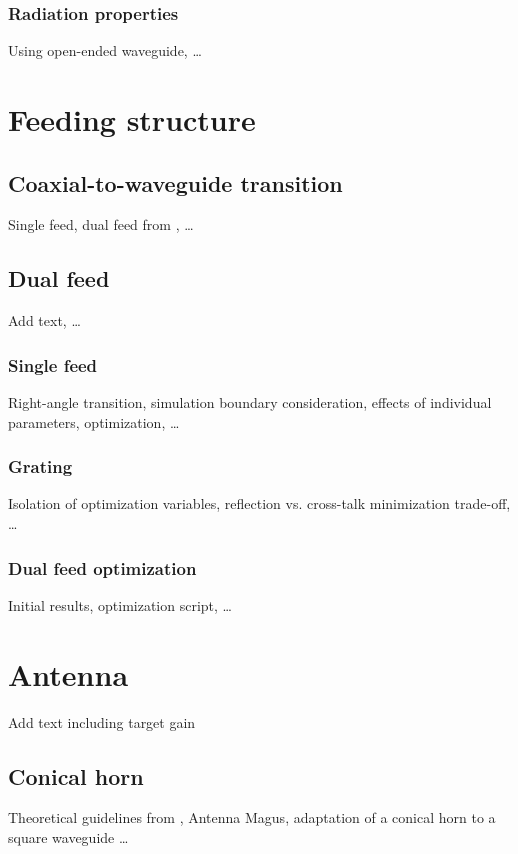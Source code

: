 \documentclass[11pt,a4paper,twoside,openany]{report}
\begin{document}
\subsection{Radiation properties}
Using open-ended waveguide, \dots

\chapter{Feeding structure}
\label{chapter:feeding-structure}

\section{Coaxial-to-waveguide transition}
Single feed, dual feed from \parencite{karki-et-al:dual-polarized-probe-for-planar-near-field-measurement}, \dots

\section{Dual feed}
Add text, \dots

\subsection{Single feed}
Right-angle transition, simulation boundary consideration, effects of individual parameters, optimization, \dots

\subsection{Grating}
Isolation of optimization variables, reflection vs. cross-talk minimization trade-off, \dots

\subsection{Dual feed optimization}
Initial results, optimization script, \dots

\chapter{Antenna}
\label{chapter:antenna}
Add text including target gain

\section{Conical horn}
Theoretical guidelines from \parencite{aboserwal-et-al:conical-horn-gain-and-amplitude-patterns}, Antenna Magus, adaptation of a conical horn to a square waveguide \dots
\end{document}
